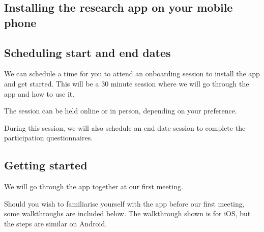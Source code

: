 
\subsection*{Installing the research app on your mobile phone}

\subsection*{Scheduling start and end dates}
We can schedule a time for you to attend an onboarding session to install the app and get started. This will be a 30 minute session where we will go through the app and how to use it.

The session can be held online or in person, depending on your preference.

During this session, we will also schedule an end date session to complete the participation questionnaires.

\subsection*{Getting started}
We will go through the app together at our first meeting.

Should you wish to familiarise yourself with the app before our first meeting, some walkthroughs are included below. The walkthrough shown is for iOS, but the steps are similar on Android.

